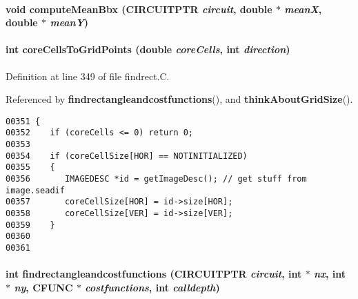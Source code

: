 \paragraph{\setlength{\rightskip}{0pt plus 5cm}void compute\-Mean\-Bbx (CIRCUITPTR {\em circuit}, double $\ast$ {\em mean\-X}, double $\ast$ {\em mean\-Y})\hspace{0.3cm}{\tt  [static]}}\hfill

\label{findrect.C_a20}
\paragraph{\setlength{\rightskip}{0pt plus 5cm}int core\-Cells\-To\-Grid\-Points (double {\em core\-Cells}, int {\em direction})\hspace{0.3cm}{\tt  [static]}}\hfill



Definition at line 349 of file findrect.C.

Referenced by {\bf findrectangleandcostfunctions}(), and {\bf think\-About\-Grid\-Size}().\small\begin{verbatim}00351 {
00352    if (coreCells <= 0) return 0;
00353 
00354    if (coreCellSize[HOR] == NOTINITIALIZED)
00355    {
00356       IMAGEDESC *id = getImageDesc(); // get stuff from image.seadif
00357       coreCellSize[HOR] = id->size[HOR];
00358       coreCellSize[VER] = id->size[VER];
00359    }
00360 
00361 
\end{verbatim}\normalsize 
\label{findrect.C_a23}
\paragraph{\setlength{\rightskip}{0pt plus 5cm}int findrectangleandcostfunctions (CIRCUITPTR {\em circuit}, int $\ast$ {\em nx}, int $\ast$ {\em ny}, {\bf CFUNC} $\ast$ {\em costfunctions}, int {\em calldepth})}\hfill



